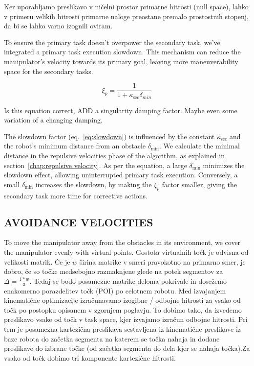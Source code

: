 \documentclass[letterpaper, 10 pt, conference]{ieeeconf}  %
\begin{document}
Ker uporabljamo preslikavo v ničelni prostor primarne hitrosti (null space), lahko v primeru velikih hitrosti primarne naloge preostane premalo prostostnih stopenj, da bi se lahko varno izognili oviram. 

\label{chap:primary slowdown}

To ensure the primary task doesn't overpower the secondary task, we've integrated a primary task execution slowdown. This mechanism can reduce the manipulator's velocity towards its primary goal, leaving more maneuverability space for the secondary tasks.

\begin{equation}
	\label{eq:slowdown}
	\xi_{p}=
	\frac{1}{1 + \kappa_{\text{sec}} \delta_{min}}
\end{equation}

\alert{Is this equation correct, ADD a singularity damping factor. Maybe even some variation of a changing damping.}

The slowdown factor (eq.~\ref{eq:slowdown}) is influenced by the constant \( \kappa_{\text{sec}} \) and the robot's minimum distance from an obstacle \( \delta_{\text{min}} \). We calculate the minimal distance in the repulsive velocities phase of the algorithm, as explained in section~\ref{chap:repulsive velocity}. As per the equation, a large \( \delta_{\text{min}} \) minimizes the slowdown effect, allowing uninterrupted primary task execution. Conversely, a small \( \delta_{\text{min}} \) increases the slowdown, by making the $\xi_{p}$ factor smaller, giving the secondary task more time for corrective actions.


\subsection{AVOIDANCE VELOCITIES}

To move the manipulator away from the obstacles in its environment, we cover the manipulator evenly with virtual points. Gostota virtualnih točk je odvisna od velikosti matrik. Če je $w$ širina matrike v smeri pravokotno na primarno smer, je dobro, če so točke medsebojno razmaknjene glede na potek segmentov za $\Delta = \frac{1 * w}{3}$. Tedaj se bodo posamezne matrike deloma pokrivale in dosežemo enakomerno porazdelitev točk (POI) po celotnem robotu. Med izvajanjem kinematične optimizacije izračunavamo izogibne / odbojne hitrosti za vsako od točk po postopku opisanem v zgornjem poglavju.  To dobimo tako, da izvedemo preslikavo vsake od točk v task space, kjer izvajamo izračun odbojne hitrosti. Pri tem je posamezna kartezična preslikava sestavljena iz kinematične preslikave iz baze robota do začetka segmenta na katerem se točka nahaja in dodane preslikave do izbrane točke (od začetka segmenta do dela kjer se nahaja točka).Za vsako od točk dobimo tri komponente kartezične hitrosti. 
\end{document}
